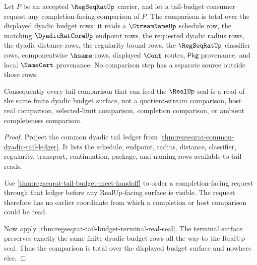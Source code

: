 \begin{theorem}
\label{thm:regseqrat-dyadic-tail-budget-totality}
Let $P$ be an accepted $\RegSeqRatUp$ carrier, and let a tail-budget consumer
request any completion-facing comparison of $P$. The comparison is total over
the displayed dyadic budget rows: it reads a $\StreamNameUp$ schedule row, the
matching $\DyadicRatCoreUp$ endpoint rows, the requested dyadic radius rows,
the dyadic distance rows, the regularity bound rows, the $\RegSeqRatUp$
classifier rows, componentwise $\hsame$ rows, displayed $\Cont$ routes,
$\mathsf{Pkg}$ provenance, and local $\NameCert$ provenance. No comparison
step has a separate source outside those rows.

Consequently every tail comparison that can feed the $\RealUp$ seal is a read
of the same finite dyadic budget surface, not a quotient-stream comparison,
host real comparison, selected-limit comparison, completion comparison, or
ambient completeness comparison.
\end{theorem}
\begin{proof}
Project the common dyadic tail ledger from
\autoref{thm:regseqrat-common-dyadic-tail-ledger}. It lists the schedule,
endpoint, radius, distance, classifier, regularity, transport, continuation,
package, and naming rows available to tail reads.

Use \autoref{thm:regseqrat-tail-budget-meet-handoff} to order a
completion-facing request through that ledger before any RealUp-facing surface
is visible. The request therefore has no earlier coordinate from which a
completion or host comparison could be read.

Now apply \autoref{thm:regseqrat-tail-budget-terminal-real-seal}. The terminal
surface preserves exactly the same finite dyadic budget rows all the way to
the RealUp seal. Thus the comparison is total over the displayed budget
surface and nowhere else.
\end{proof}

